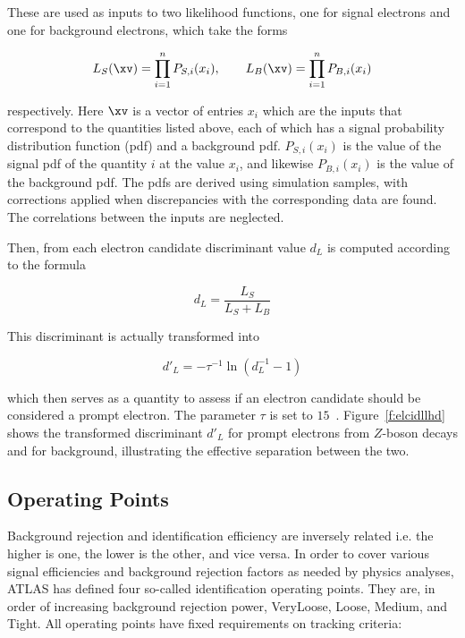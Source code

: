 These are used as inputs to two likelihood functions, one for signal electrons
and one for background electrons, which take the forms

$$L_S(\xv) = \prod_{i=1}^n P_{S,i}(x_i), \qquad
	L_B(\xv) = \prod_{i=1}^n P_{B,i}(x_i)
$$

respectively. Here $\xv$ is a vector of entries $x_i$ which are the inputs that
correspond to the quantities listed above, each of which has a signal
probability distribution function (pdf) and a background pdf. $P_{S,i}(x_i)$ is
the value of the signal pdf of the quantity $i$ at the value $x_i$, and
likewise $P_{B,i}(x_i)$ is the value of the background pdf. The pdfs are
derived using simulation samples, with corrections applied when discrepancies
with the corresponding data are found. The correlations between the inputs are
neglected.

Then, from each electron candidate discriminant value $d_L$ is computed
according to the formula

$$
	d_L = \frac{L_S}{L_S + L_B}
$$

This discriminant is actually transformed into

\begin{equation}\label{eq:dpl}
	d'_L = -\tau^{-1}\ln (d_L^{-1} - 1)
\end{equation}

which then serves as a quantity to assess if an electron candidate should be
considered a prompt electron. The parameter $\tau$ is set to
$15$~\cite{c4taup}. Figure~\ref{f:elcidllhd} shows the transformed discriminant
$d'_L$ for prompt electrons from $Z$-boson decays and for background,
illustrating the effective separation between the two.


\subsection{Operating Points}\label{ss:elop}

Background rejection and identification efficiency are inversely
related i.e. the higher is one, the lower is the other, and vice versa. In
order to cover various signal efficiencies and background rejection factors as
needed by physics analyses, ATLAS has defined four so-called identification
operating points. They are, in order of increasing background rejection power,
VeryLoose, Loose, Medium, and Tight. All operating points have fixed
requirements on tracking criteria:

